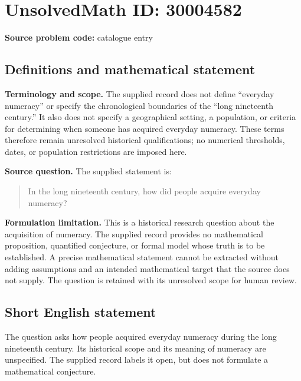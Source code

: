\documentclass[11pt]{article}
\begin{document}
\section*{UnsolvedMath ID: 30004582}
\textbf{Source problem code:} catalogue entry
\subsection{Definitions and mathematical statement}
\textbf{Terminology and scope.} The supplied record does not define ``everyday numeracy'' or specify the chronological boundaries of the ``long nineteenth century.'' It also does not specify a geographical setting, a population, or criteria for determining when someone has acquired everyday numeracy. These terms therefore remain unresolved historical qualifications; no numerical thresholds, dates, or population restrictions are imposed here.

\textbf{Source question.} The supplied statement is:
\begin{quote}
In the long nineteenth century, how did people acquire everyday numeracy?
\end{quote}

\textbf{Formulation limitation.} This is a historical research question about the acquisition of numeracy. The supplied record provides no mathematical proposition, quantified conjecture, or formal model whose truth is to be established. A precise mathematical statement cannot be extracted without adding assumptions and an intended mathematical target that the source does not supply. The question is retained with its unresolved scope for human review.
\subsection{Short English statement}
The question asks how people acquired everyday numeracy during the long nineteenth century. Its historical scope and its meaning of numeracy are unspecified. The supplied record labels it open, but does not formulate a mathematical conjecture.
\end{document}

